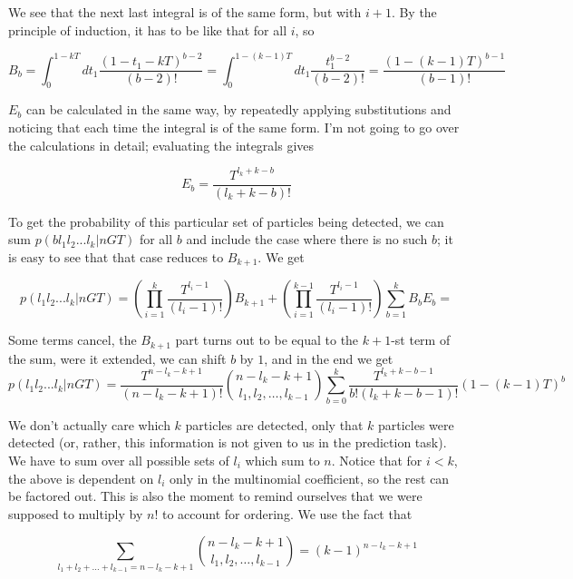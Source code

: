 \documentclass{note}
\begin{document}
\begin{solution}
We see that the next last integral is of the same form, but with $i + 1$. By the principle of induction, it has to be like that for all $i$, so

\begin{equation*}
B_b = \int_{0}^{1-kT} dt_1 \frac{(1 - t_1 - kT)^{b-2}}{(b - 2)!} = \int_{0}^{1 - (k-1)T} dt_1 \frac{t_1^{b-2}}{(b-2)!} = \frac{(1 - (k-1)T)^{b-1}}{(b-1)!}
\end{equation*}

$E_b$ can be calculated in the same way, by repeatedly applying substitutions and noticing that each time the integral is of the same form. I'm not going to go over the calculations in detail; evaluating the integrals gives

\begin{equation*}
E_b = \frac{T^{l_k+k-b}}{(l_k+k-b)!}
\end{equation*}

To get the probability of this particular set of particles being detected, we can sum $p(b l_1 l_2 ... l_k | n G T)$ for all $b$ and include the case where there is no such $b$; it is easy to see that that case reduces to $B_{k+1}$. We get

\begin{equation*}
p(l_1 l_2 ... l_k | n G T) = \left(\prod_{i=1}^{k} \frac{T^{l_i - 1}}{(l_i - 1)!}\right) B_{k+1} + \left(\prod_{i=1}^{k-1} \frac{T^{l_i - 1}}{(l_i - 1)!}\right) \sum_{b=1}^{k} B_b E_b = 
\end{equation*}

Some terms cancel, the $B_{k+1}$ part turns out to be equal to the $k+1$-st term of the sum, were it extended, we can shift $b$ by $1$, and in the end we get
\begin{equation*}
p(l_1 l_2 ... l_k | n G T) = \frac{T^{n-l_k-k+1}}{(n-l_k-k+1)!} \binom{n-l_k-k+1}{l_1, l_2, \ldots, l_{k-1}} \sum_{b=0}^{k} \frac{T^{l_k+k-b-1}}{b!(l_k+k-b-1)!} (1-(k-1)T)^b
\end{equation*}

We don't actually care which $k$ particles are detected, only that $k$ particles were detected (or, rather, this information is not given to us in the prediction task). We have to sum over all possible sets of $l_i$ which sum to $n$. Notice that for $i < k$, the above is dependent on $l_i$ only in the multinomial coefficient, so the rest can be factored out. This is also the moment to remind ourselves that we were supposed to multiply by $n!$ to account for ordering. We use the fact that

\begin{equation*}
\sum_{l_1+l_2+\ldots+l_{k-1}=n-l_k-k+1} \binom{n-l_k-k+1}{l_1, l_2, \ldots, l_{k-1}} = (k-1)^{n-l_k-k+1}
\end{equation*}


\end{solution}
\end{document}
